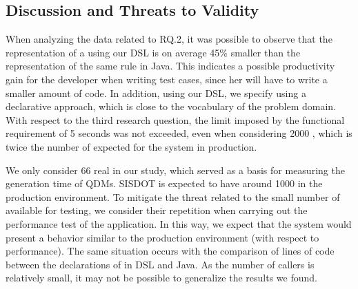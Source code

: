 \subsection{Discussion and Threats to Validity}

When analyzing the data related to RQ.2, it was possible to observe that the representation 
of a \shc using our DSL is on average 45\% smaller than the representation of the same rule in Java. 
This indicates a possible productivity gain for the developer when writing test cases, 
since her will have to write a smaller amount of code. In addition, using our DSL, we 
specify \callers using a declarative approach, which is close to the vocabulary of 
the problem domain. 
With respect to the third research question, the limit imposed by the functional requirement of 5 seconds was not exceeded,  
even when considering 2000 \callers, which is twice the number of \callers expected for the system 
in production.




We only consider 66 real \callers in our study, which served as a basis for measuring the generation time 
of QDMs. SISDOT is expected to have around 1000 \callers in the production environment. To mitigate the threat 
related to the small number of available \callers for testing, we consider their repetition when carrying out the 
performance test of the application. In this way, we expect that the system would present a behavior similar 
to the production environment (with respect to performance). The same situation occurs with the comparison 
of lines of code between the declarations of \callers in DSL and Java. As the number of callers is relatively small, 
it may not be possible to generalize the results we found.
